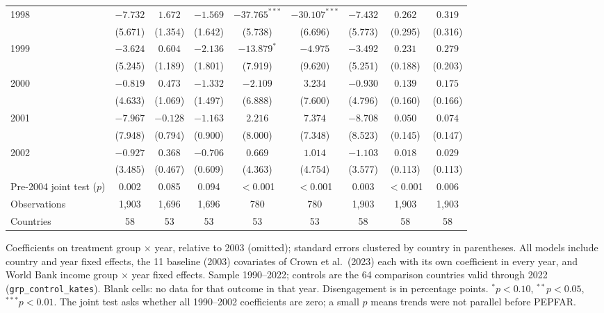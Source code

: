 \begin{table}[htbp]
{\begin{tabular}{lcccccccc}
1998 & $-7.732$ & $1.672$ & $-1.569$ & $-37.765^{***}$ & $-30.107^{***}$ & $-7.432$ & $0.262$ & $0.319$ \\
 & (5.671) & (1.354) & (1.642) & (5.738) & (6.696) & (5.773) & (0.295) & (0.316) \\
1999 & $-3.624$ & $0.604$ & $-2.136$ & $-13.879^{*}$ & $-4.975$ & $-3.492$ & $0.231$ & $0.279$ \\
 & (5.245) & (1.189) & (1.801) & (7.919) & (9.620) & (5.251) & (0.188) & (0.203) \\
2000 & $-0.819$ & $0.473$ & $-1.332$ & $-2.109$ & $3.234$ & $-0.930$ & $0.139$ & $0.175$ \\
 & (4.633) & (1.069) & (1.497) & (6.888) & (7.600) & (4.796) & (0.160) & (0.166) \\
2001 & $-7.967$ & $-0.128$ & $-1.163$ & $2.216$ & $7.374$ & $-8.708$ & $0.050$ & $0.074$ \\
 & (7.948) & (0.794) & (0.900) & (8.000) & (7.348) & (8.523) & (0.145) & (0.147) \\
2002 & $-0.927$ & $0.368$ & $-0.706$ & $0.669$ & $1.014$ & $-1.103$ & $0.018$ & $0.029$ \\
 & (3.485) & (0.467) & (0.609) & (4.363) & (4.754) & (3.577) & (0.113) & (0.113) \\
\midrule
Pre-2004 joint test ($p$) & 0.002 & 0.085 & 0.094 & $<$0.001 & $<$0.001 & 0.003 & $<$0.001 & 0.006 \\
Observations & 1,903 & 1,696 & 1,696 & 780 & 780 & 1,903 & 1,903 & 1,903 \\
Countries & 58 & 53 & 53 & 53 & 53 & 58 & 58 & 58 \\
\bottomrule
\end{tabular}}
\par\vspace{4pt}
\begin{minipage}{\textwidth}\footnotesize Coefficients on treatment group $\times$ year, relative to 2003 (omitted); standard errors clustered by country in parentheses. All models include country and year fixed effects, the 11 baseline (2003) covariates of Crown et al.\ (2023) each with its own coefficient in every year, and World Bank income group $\times$ year fixed effects. Sample 1990--2022; controls are the 64 comparison countries valid through 2022 (\texttt{grp\_control\_kates}). Blank cells: no data for that outcome in that year. Disengagement is in percentage points. $^{*}p<0.10$, $^{**}p<0.05$, $^{***}p<0.01$. The joint test asks whether all 1990--2002 coefficients are zero; a small $p$ means trends were not parallel before PEPFAR.\end{minipage}
\end{table}

